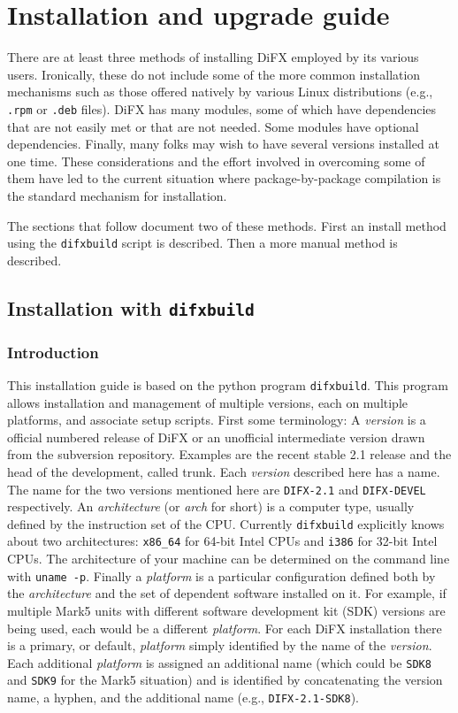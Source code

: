 


\section{Installation and upgrade guide} \label{sec:install}

There are at least three methods of installing DiFX employed by its various users.
Ironically, these do not include some of the more common installation mechanisms such as those offered natively by various Linux distributions (e.g., {\tt .rpm} or {\tt .deb} files).
DiFX has many modules, some of which have dependencies that are not easily met or that are not needed.
Some modules have optional dependencies.
Finally, many folks may wish to have several versions installed at one time.
These considerations and the effort involved in overcoming some of them have led to the current situation where package-by-package compilation is the standard mechanism for installation.

The sections that follow document two of these methods.
First an install method using the {\tt difxbuild} script is described.
Then a more manual method is described.


\subsection{Installation with {\tt difxbuild}} \label{sec:installdifxbuild}


\subsubsection{Introduction}

This installation guide is based on the python program {\tt difxbuild}.
This program allows installation and management of multiple versions, each on multiple platforms, and associate setup scripts.
First some terminology: A {\em version} is a official numbered release of DiFX or an unofficial intermediate version drawn from the subversion repository.
Examples are the recent stable 2.1 release and the head of the development, called trunk.
Each {\em version} described here has a name.
The name for the two versions mentioned here are {\tt DIFX-2.1} and {\tt DIFX-DEVEL} respectively.
An {\em architecture} (or {\em arch} for short) is a computer type, usually defined by the instruction set of the CPU.
Currently {\tt difxbuild} explicitly knows about two architectures: {\tt x86\_64} for 64-bit Intel CPUs and {\tt i386} for 32-bit Intel CPUs.
The architecture of your machine can be determined on the command line with {\tt uname -p}.
Finally a {\em platform} is a particular configuration defined both by the {\em architecture} and the set of dependent software installed on it.
For example, if multiple Mark5 units with different software development kit (SDK) versions are being used, each would be a different {\em platform}.
For each DiFX installation there is a primary, or default, {\em platform} simply identified by the name of the {\em version}.
Each additional {\em platform} is assigned an additional name (which could be {\tt SDK8} and {\tt SDK9} for the Mark5 situation) and is identified by concatenating the version name, a hyphen, and the additional name (e.g., {\tt DIFX-2.1-SDK8}).

